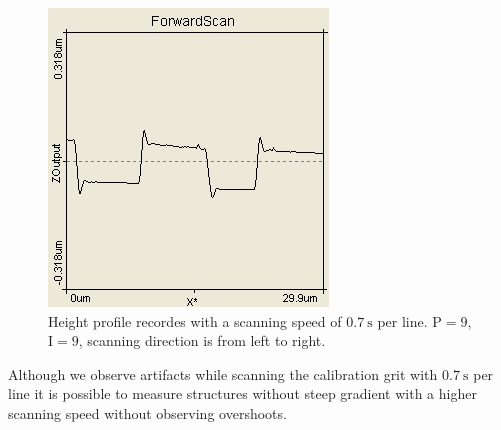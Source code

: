 \documentclass[paper=a4,fontsize=10pt,DIV=18,twocolumn,parskip=half]{scrartcl}
\numberwithin{equation}{section}    %
\begin{document}
\begin{figure}[htp]
    \begin{center}
        \includegraphics[width=0.6\columnwidth]{Bilder/fast}
        \caption{Height profile recordes with a scanning speed of 
        $\SI{0.7}{\second}$ per line. $\mathrm{P}=9$, $\mathrm{I}=9$, scanning 
        direction is from left to right.}
        \label{fast}
    \end{center}
\end{figure}

Although we observe artifacts while scanning the calibration grit with  
$\SI{0.7}{\second}$ per line it is possible to measure structures without steep 
gradient with a higher scanning speed without observing overshoots.
\end{document}
